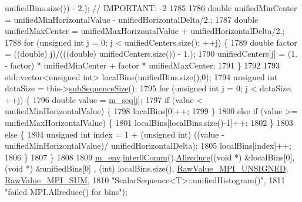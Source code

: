 \begin{DoxyCode}
      unifiedBins.size()) - 2.); \textcolor{comment}{// IMPORTANT: -2}
1785 
1786       \textcolor{keywordtype}{double} unifiedMinCenter = unifiedMinHorizontalValue - unifiedHorizontalDelta/2.;
1787       \textcolor{keywordtype}{double} unifiedMaxCenter = unifiedMaxHorizontalValue + unifiedHorizontalDelta/2.;
1788       \textcolor{keywordflow}{for} (\textcolor{keywordtype}{unsigned} \textcolor{keywordtype}{int} j = 0; j < unifiedCenters.size(); ++j) \{
1789         \textcolor{keywordtype}{double} factor = ((double) j)/(((double) unifiedCenters.size()) - 1.);
1790         unifiedCenters[j] = (1. - factor) * unifiedMinCenter + factor * unifiedMaxCenter;
1791       \}
1792 
1793       std::vector<unsigned int> localBins(unifiedBins.size(),0);
1794       \textcolor{keywordtype}{unsigned} \textcolor{keywordtype}{int} dataSize = this->\hyperlink{class_q_u_e_s_o_1_1_scalar_sequence_a0288ea295eedc216a1617b3286f6f3a0}{subSequenceSize}();
1795       \textcolor{keywordflow}{for} (\textcolor{keywordtype}{unsigned} \textcolor{keywordtype}{int} j = 0; j < dataSize; ++j) \{
1796         \textcolor{keywordtype}{double} value = \hyperlink{class_q_u_e_s_o_1_1_scalar_sequence_ae616036fd2e62fb69df167814545e893}{m\_seq}[j];
1797         \textcolor{keywordflow}{if} (value < unifiedMinHorizontalValue) \{
1798           localBins[0]++;
1799         \}
1800         \textcolor{keywordflow}{else} \textcolor{keywordflow}{if} (value >= unifiedMaxHorizontalValue) \{
1801           localBins[localBins.size()-1]++;
1802         \}
1803         \textcolor{keywordflow}{else} \{
1804           \textcolor{keywordtype}{unsigned} \textcolor{keywordtype}{int} index = 1 + (\textcolor{keywordtype}{unsigned} int) ((value - unifiedMinHorizontalValue)/
      unifiedHorizontalDelta);
1805           localBins[index]++;
1806         \}
1807       \}
1808 
1809       \hyperlink{class_q_u_e_s_o_1_1_scalar_sequence_a71618cd6351b29361b437af68447a4c8}{m\_env}.\hyperlink{class_q_u_e_s_o_1_1_base_environment_a689e4d140c74d495d97eb498714a4b82}{inter0Comm}().\hyperlink{class_q_u_e_s_o_1_1_mpi_comm_a72e137e60ef8060efb1ee5fc874fa4b8}{Allreduce}((\textcolor{keywordtype}{void} *) &localBins[0], (\textcolor{keywordtype}{void} *) &unifiedBins[0]
      , (\textcolor{keywordtype}{int}) localBins.size(), \hyperlink{_mpi_comm_8h_a06cbfbc33436f6e0dc8a48ff3c49bdfc}{RawValue\_MPI\_UNSIGNED}, 
      \hyperlink{_mpi_comm_8h_afbf78d291c032aa7f512bc566cee2bd1}{RawValue\_MPI\_SUM},
1810                                    \textcolor{stringliteral}{"ScalarSequence<T>::unifiedHistogram()"},
1811                                    \textcolor{stringliteral}{"failed MPI.Allreduce() for bins"});

\end{DoxyCode}
